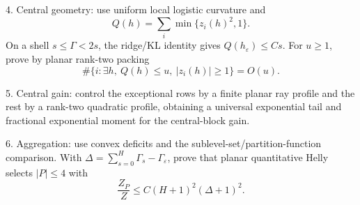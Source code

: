\documentclass[11pt, letterpaper, hidelinks]{article}
\newcommand{\1}{\mathbf 1}
\renewcommand{\le}{\leqslant}
\renewcommand{\ge}{\geqslant}
\theoremstyle{plain}
\theoremstyle{definition}
\begin{document}
\begin{promptbox}
4. Central geometry: use uniform local logistic curvature and
   \[
   Q(h)=\sum_i\min\{z_i(h)^2,1\}.
   \]
   On a shell \(s\le\Gamma<2s\), the ridge/KL identity gives
   \(Q(h_\varepsilon)\le Cs\). For \(u\ge1\), prove by planar rank-two packing
   \[
   \#\{i:\exists h,\ Q(h)\le u,\ |z_i(h)|\ge1\}=O(u).
   \]

5. Central gain: control the exceptional rows by a finite planar ray profile
   and the rest by a rank-two quadratic profile, obtaining a universal exponential
   tail and fractional exponential moment for the central-block gain.

6. Aggregation: use convex deficits and the sublevel-set/partition-function
   comparison. With \(\Delta=\sum_{s=0}^H\Gamma_s-\Gamma_\varepsilon\), prove that
   planar quantitative Helly selects \(|P|\le4\) with
   \[
   \frac{Z_P}{Z}\le C(H+1)^2(\Delta+1)^2.
   \]
\end{promptbox}
\end{document}
